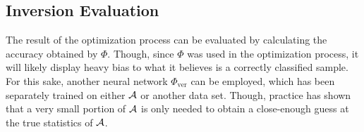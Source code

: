 \subsection{Inversion Evaluation}
The result of the optimization process can be evaluated by calculating the accuracy obtained by $\Phi$. 
Though, since $\Phi$ was used in the optimization process, it will likely display heavy bias to what it believes is a correctly classified sample.
For this sake, another neural network $\Phi_{\text{ver}}$ can be employed, which has been separately trained on either $\mathcal A$ or another data set. Though, practice has shown that a very small portion of $\mathcal A$ is only needed to obtain a close-enough guess at the true statistics of $\mathcal A$.

